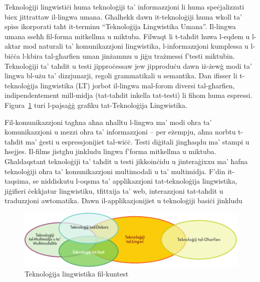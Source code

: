 \begin{multicols}{2}

Teknoloġiji lingwistiċi huma teknoloġiji ta’ informazzjoni li huma speċjalizzati biex jittrattaw il-lingwa umana. Għalhekk dawn it-teknoloġiji huma wkoll ta’ spiss ikorporati taħt it-terminu “Teknoloġija Lingwistika Umana”. Il-lingwa umana sseħħ fil-forma mitkellma u miktuba. Filwaqt li t-taħdit huwa l-eqdem u l-aktar mod naturali ta’ komunikazzjoni lingwistika, l-informazzjoni kumplessa u l-biċċa l-kbira tal-għarfien uman jinżammu u jiġu trażmessi f’testi miktubin. Teknoloġiji ta’ taħdit u testi jipproċessaw jew jipproduċu dawn iż-żewġ modi ta’ lingwa bl-użu ta’ dizzjunarji, regoli grammatikali u semantika. Dan ifisser li t-teknoloġija lingwistika (LT) jorbot il-lingwa mal-forom diversi tal-għarfien, indipendentement mill-midja (tat-taħdit inkella tat-testi) li fihom huma espressi. Figura~\ref{fig:ltincontext_mt} turi l-pajsaġġ grafiku tat-Teknoloġija Lingwistika. 

Fil-komunikazzjoni tagħna aħna nħalltu l-lingwa ma’ modi oħra ta’ komunikazzjoni u mezzi oħra ta’ informazzjoni – per eżempju, aħna norbtu t-taħdit ma’ ġesti u espressjonijiet tal-wiċċ. Testi diġitali jingħaqdu ma’ stampi u ħsejjes. Il-films jistgħu jinkludu lingwa f’forma mitkellma u miktuba. Għaldaqstant teknoloġiji ta’ taħdit u testi jikkoinċidu u jinteraġixxu ma’ ħafna teknoloġiji oħra ta’ komunikazzjoni multimodali u ta' multimidja.
%
F'din it-taqsima, se niddiskutu l-oqsma ta' applikazzjoni tat-teknoloġija lingwistika, jiġifieri ċekkjatur lingwistiku, tfittxija ta' web, interazzjoni tat-taħdit u traduzzjoni awtomatika. Dawn il-applikazjonijiet u teknoloġiji basiċi jinkludu

\begin{figure}[htb]
  \center
  \includegraphics[width=\textwidth]{../_media/maltese/language_technologies}
  \caption{Teknoloġija lingwistika fil-kuntest}
  \label{fig:ltincontext_mt}
\end{figure}



\end{multicols}
